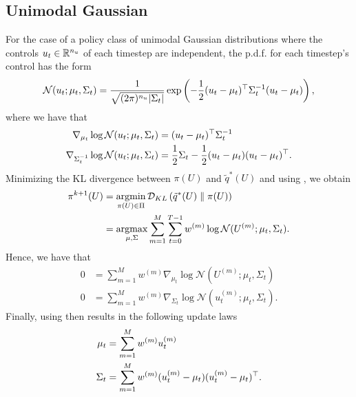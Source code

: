 \documentclass[twoside,11pt]{article}
\begin{document}
\subsection{Unimodal Gaussian}
For the case of a policy class of unimodal Gaussian distributions where the controls $u_t \in \mathbb{R}^{n_u}$ of each timestep are independent, the p.d.f. for each timestep's control has the form
\begin{equation}
    \mathcal{N}(u_t; \mu_t, \Sigma_t)
    = \frac{1}{\sqrt{(2 \pi)^{n_u} \lvert\Sigma_t\rvert}} \exp \left( -\frac{1}{2} (u_t - \mu_t)^\top \Sigma_t^{-1} (u_t - \mu_t) \right),
\end{equation}
where we have that 
\begin{align}
    \nabla_{\mu_t} \log \mathcal{N}(u_t; \mu_t, \Sigma_t)
        &= (u_t - \mu_t)^\top \Sigma_t^{-1} \label{eq:derive_update:unimodal:mu} \\
    \nabla_{\Sigma_t^{-1}} \log \mathcal{N}(u_t; \mu_t, \Sigma_t)
        &= \frac{1}{2} \Sigma_t - \frac{1}{2} (u_t - \mu_t)(u_t - \mu_t)^\top \label{eq:derive_update:unimodal:sigma} .
\end{align}
Minimizing the KL divergence between $\pi(U)$ and $\tilde{q}^*(U)$ and using , we obtain
\begin{align}
    \pi^{k+1}(U)
    &= \argmin_{\pi(U) \in \Pi} \KL{\tilde{q}^*(U)}{\pi(U)} \\
    &= \argmax_{\mu, \Sigma} \sum_{m=1}^M \sum_{t=0}^{T-1} w^{(m)} \log \mathcal{N}(U^{(m)}; \mu_t, \Sigma_t).
\end{align}
Hence, we have that
\begin{align}
     0 &= \sum_{m=1}^M w^{(m)} \nabla_{\mu_t} \log \mathcal{N}(U^{(m)}; \mu_t, \Sigma_t) \\
     0 &= \sum_{m=1}^M w^{(m)} \nabla_{\Sigma_t} \log \mathcal{N}(u_t^{(m)}; \mu_t, \Sigma_t).
\end{align}
Finally, using  then results in the following update laws
\begin{align}
    \mu_t &= \sum_{m=1}^M w^{(m)} u_t^{(m)} \\
    \Sigma_t &= \sum_{m=1}^M w^{(m)} (u_t^{(m)} - \mu_t) (u_t^{(m)} - \mu_t)^\top .
\end{align}
\end{document}
